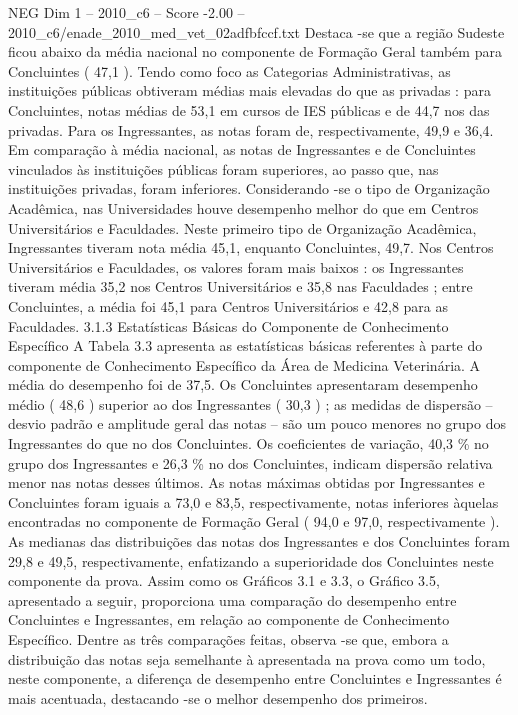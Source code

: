\begin{textsample}{NEG Dim 1 – 2010\_c6 – Score -2.00 – 2010\_c6/enade\_2010\_med\_vet\_02adfbfccf.txt}
Destaca -se que a região Sudeste ficou abaixo da média nacional no componente de Formação Geral também para Concluintes ( 47,1 ).
Tendo como foco as Categorias Administrativas, as instituições públicas obtiveram médias mais elevadas do que as privadas : para Concluintes, notas médias de 53,1 em cursos de IES públicas e de 44,7 nos das privadas.
Para os Ingressantes, as notas foram de, respectivamente, 49,9 e 36,4.
Em comparação à média nacional, as notas de Ingressantes e de Concluintes vinculados às instituições públicas foram superiores, ao passo que, nas instituições privadas, foram inferiores.
Considerando -se o tipo de Organização Acadêmica, nas Universidades houve desempenho melhor do que em Centros Universitários e Faculdades.
Neste primeiro tipo de Organização Acadêmica, Ingressantes tiveram nota média 45,1, enquanto Concluintes, 49,7.
Nos Centros Universitários e Faculdades, os valores foram mais baixos : os Ingressantes tiveram média 35,2 nos Centros Universitários e 35,8 nas Faculdades ; entre Concluintes, a média foi 45,1 para Centros Universitários e 42,8 para as Faculdades. 3.1.3 Estatísticas Básicas do Componente de Conhecimento Específico A Tabela 3.3 apresenta as estatísticas básicas referentes à parte do componente de Conhecimento Específico da Área de Medicina Veterinária.
A média do desempenho foi de 37,5.
Os Concluintes apresentaram desempenho médio ( 48,6 ) superior ao dos Ingressantes ( 30,3 ) ; as medidas de dispersão – desvio padrão e amplitude geral das notas – são um pouco menores no grupo dos Ingressantes do que no dos Concluintes.
Os coeficientes de variação, 40,3 \% no grupo dos Ingressantes e 26,3 \% no dos Concluintes, indicam dispersão relativa menor nas notas desses últimos.
As notas máximas obtidas por Ingressantes e Concluintes foram iguais a 73,0 e 83,5, respectivamente, notas inferiores àquelas encontradas no componente de Formação Geral ( 94,0 e 97,0, respectivamente ).
As medianas das distribuições das notas dos Ingressantes e dos Concluintes foram 29,8 e 49,5, respectivamente, enfatizando a superioridade dos Concluintes neste componente da prova.
Assim como os Gráficos 3.1 e 3.3, o Gráfico 3.5, apresentado a seguir, proporciona uma comparação do desempenho entre Concluintes e Ingressantes, em relação ao componente de Conhecimento Específico.
Dentre as três comparações feitas, observa -se que, embora a distribuição das notas seja semelhante à apresentada na prova como um todo, neste componente, a diferença de desempenho entre Concluintes e Ingressantes é mais acentuada, destacando -se o melhor desempenho dos primeiros.

\end{textsample}
